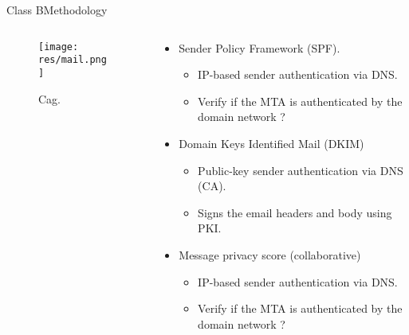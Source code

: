 \begin{frame}{Class B}{Methodology}

	\begin{columns}
	
		\begin{column}{0.35\textwidth}
				\begin{figure}
					\texttt{[image: res/mail.png]}
					\caption{\label{fig:g}Cag.}
				\end{figure}
		\end{column}
		
		\begin{column}{0.71\textwidth}
			\begin{itemize}
			
				\item Sender Policy Framework (SPF).\cite{aghiles}
				\begin{itemize}
					\item IP-based sender authentication via DNS.\cite{aghilesdjoudi}
					\item Verify if the MTA is authenticated by the domain network ?
				\end{itemize}
				
				\item Domain Keys Identified Mail (DKIM) 
				\begin{itemize}
					\item Public-key sender authentication via DNS (CA).
					\item Signs the email headers and body using PKI.
				\end{itemize}
				
				\item Message privacy score (collaborative)
				\begin{itemize}
					\item IP-based sender authentication via DNS.
					\item Verify if the MTA is authenticated by the domain network ?
				\end{itemize}

			\end{itemize}
		\end{column}
	\end{columns}
\end{frame}

